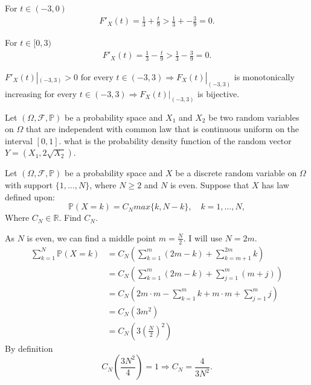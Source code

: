 \begin{exercise}[]
\begin{enumerate}[label=(\alph*), start=2]
            For $t \in (-3, 0) $
            \begin{align*}
                F'_X(t) = \frac{1}{3} + \frac{t}{9} > \frac{1}{3} + -\frac{3}{9} = 0
            .\end{align*}

            For $t \in [0, 3) $
            \begin{align*}
                F'_X(t) = \frac{1}{3} - \frac{t}{9} > \frac{1}{3} - \frac{3}{9} = 0
            .\end{align*}

            $F'_X(t)|_{(-3,3)} > 0 \text{ for every } t \in (-3, 3) \Rightarrow F_X(t)|_{(-3,3)}$
            is monotonically increasing for every $t \in (-3, 3) \Rightarrow F_X(t)|_{(-3,3)}$
            is bijective.

    \end{enumerate}
\end{exercise}

\begin{exercise}[]
    \label{ex:12.4}
    Let $(\Omega, \mathcal{F}, \mathbb{P})$ be a probability space and $X_1 $ and $X_2 $ be two
    random variables on $\Omega$ that are independent with common law that is continuous uniform
    on the interval $\left[ 0,1 \right]  $. what is the probability density function of the
    random vector $Y=(X_1, 2\sqrt{X_2} ) $.
\end{exercise}

\begin{exercise}[]
    \label{ex:12.5}
    Let $(\Omega, \mathcal{F}, \mathbb{P})$ be a probability space and $X$ be a discrete random variable on $\Omega$ with 
    support $\{1,\ldots, N\} $, where $N\ge 2$ and $N$ is even. Suppose that $X$ has law defined upon:
    \[
    \mathbb{P}(X=k) = C_N max \{k, N-k\}, \quad k=1,\ldots,N
    ,\] 
    Where $C_N \in \mathbb{R}$. Find $C_N$.

    As $N$ is even, we can find a middle point $m = \frac{N}{2}$. I will use $N=2m$.
    \begin{align*}
    \sum_{k=1}^{N} \mathbb{P}(X = k) &= C_N(\sum_{k=1}^{m} (2m - k) + \sum_{k=m+1}^{2m} k )\\
    &= C_N(\sum_{k=1}^{m} (2m - k) + \sum_{j=1}^{m} (m + j)) \\
    &= C_N(2m\cdot m - \sum_{k=1}^{m} k + m\cdot m  + \sum_{j=1}^{m} j) \\
    &= C_N(3m^{2}) \\
    &= C_N(3(\frac{N}{2})^{2})
    \end{align*}
    By definition
    \[
    C_N(\frac{3N^{2}}{4}) = 1 \Rightarrow C_N = \frac{4}{3N^{2}}
    .\] 
\end{exercise}
